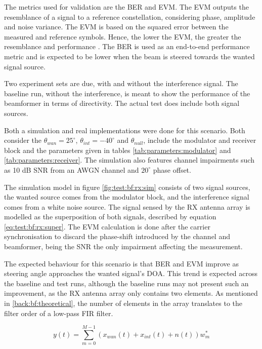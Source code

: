 \documentclass[12pt,a4paper]{report}
\begin{document}
The metrics used for validation are the BER and EVM. The EVM outputs the resemblance of a signal to a reference constellation, considering phase, amplitude and noise variance. The EVM is based on the squared error between the measured and reference symbols. Hence, the lower the EVM, the greater the resemblance and performance \cite{Mathworks2020MeasureMagnitude}. The BER is used as an end-to-end performance metric and is expected to be lower when the beam is steered towards the wanted signal source. 

Two experiment sets are due, with and without the interference signal. The baseline run, without the interference, is meant to show the performance of the beamformer in terms of directivity. The actual test does include both signal sources. 

Both a simulation and real implementations were done for this scenario. Both consider the $\theta_{wan} = 25^\circ$, $\theta_{int} = -40^\circ$ and $\theta_{null}$, include the modulator and receiver block and the parameters given in tables \ref{tab:parameters:modulator} and \ref{tab:parameters:receiver}. The simulation also features channel impairments such as 10 dB SNR from an AWGN channel and $20^\circ$ phase offset.

The simulation model in figure \ref{fig:test:bf:rx:sim} consists of two signal sources, the wanted source comes from the modulator block, and the interference signal comes from a white noise source. The signal sensed by the RX antenna array is modelled as the superposition of both signals, described by equation \ref{eq:test:bf:rx:super}. The EVM calculation is done after the carrier synchronisation to discard the phase-shift introduced by the channel and beamformer, being the SNR the only impairment affecting the measurement.

The expected behaviour for this scenario is that BER and EVM improve as steering angle approaches the wanted signal's DOA. This trend is expected across the baseline and test runs, although the baseline runs may not present such an improvement, as the RX antenna array only contains two elements. As mentioned in \ref{back:bf:theoretical}, the number of elements in the array translates to the filter order of a low-pass FIR filter.

\begin{equation}
    y(t) = \sum^{M-1}_{m=0} (x_{wan}(t) + x_{int}(t) + n(t))w_m^* 
    \label{eq:test:bf:rx:super}
\end{equation}
\end{document}
